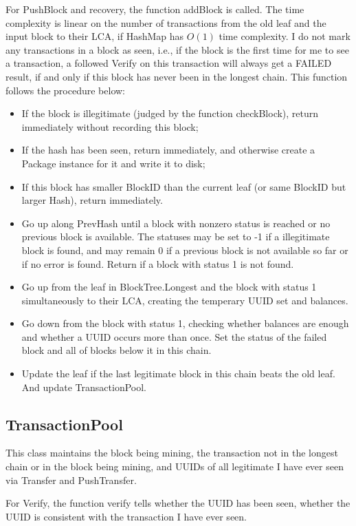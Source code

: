 \documentclass{article}
\begin{document}
For PushBlock and recovery, the function addBlock is called.
The time complexity is linear on the number of transactions from the old leaf and the input block to their LCA, if HashMap has $O(1)$ time complexity.
I do not mark any transactions in a block as seen, i.e., if the block is the first time for me to see a transaction, a followed Verify on this transaction will always get a FAILED result, if and only if this block has never been in the longest chain.
This function follows the procedure below:
\begin{itemize}
\item If the block is illegitimate (judged by the function checkBlock), return immediately without recording this block;
\item If the hash has been seen, return immediately, and otherwise create a Package instance for it and write it to disk;
\item If this block has smaller BlockID than the current leaf (or same BlockID but larger Hash), return immediately.
\item Go up along PrevHash until a block with nonzero status is reached or no previous block is available. The statuses may be set to -1 if a illegitimate block is found, and may remain 0 if a previous block is not available so far or if no error is found. Return if a block with status 1 is not found.
\item Go up from the leaf in BlockTree.Longest and the block with status 1 simultaneously to their LCA, creating the temperary UUID set and balances.
\item Go down from the block with status 1, checking whether balances are enough and whether a UUID occurs more than once. Set the status of the failed block and all of blocks below it in this chain.
\item Update the leaf if the last legitimate block in this chain beats the old leaf. And update TransactionPool.
\end{itemize}

\subsection{TransactionPool}

This class maintains the block being mining, the transaction not in the longest chain or in the block being mining, and UUIDs of all legitimate I have ever seen via Transfer and PushTransfer.

For Verify, the function verify tells whether the UUID has been seen, whether the UUID is consistent with the transaction I have ever seen.
\end{document}
